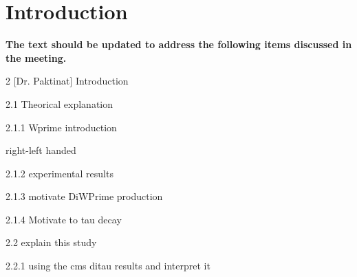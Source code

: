 \section{Introduction}\label{sec:int} 


{\bf The text should be updated to address the following items discussed in the meeting.}

2 [Dr. Paktinat] Introduction

2.1 Theorical explanation

2.1.1 Wprime introduction

right-left handed

2.1.2 experimental results

2.1.3 motivate DiWPrime production

2.1.4 Motivate to tau decay

2.2 explain this study

2.2.1 using the cms ditau results and interpret it




